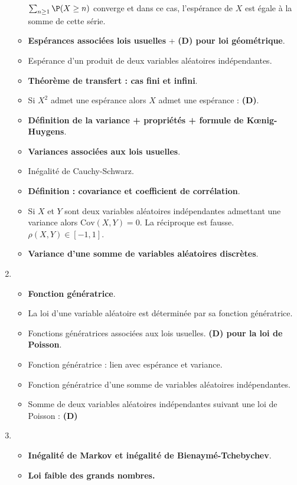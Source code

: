 \documentclass[twoside,a4paper,french,10pt]{VcCours}
\begin{document}
\begin{enumerate}
\begin{itemize}
  $\sum_{n \geq 1} \P(X \geq n)$
  converge et dans ce cas, l'espérance de $X$ est égale à la somme de cette série.
  \item \textbf{Espérances associées lois usuelles} + \textbf{(D) pour loi géométrique}.
  \item Espérance d'un produit de deux variables aléatoires indépendantes.
  \item \textbf{Théorème de transfert : cas fini et infini}. 
  \item Si $X^2$ admet une espérance alors $X$ admet une espérance : \textbf{(D)}.
  \item \textbf{Définition de la variance + propriétés + formule de Kœnig-Huygens}.
  \item \textbf{Variances associées aux lois usuelles}.
  \item Inégalité de Cauchy-Schwarz.
  \item \textbf{Définition : covariance et coefficient de corrélation}.
  \item Si $X$ et $Y$ sont deux variables aléatoires indépendantes admettant une variance alors $\textrm{Cov}(X,Y)=0$. La réciproque est fausse.
  $\rho(X,Y) \in [-1,1]$.
  \item \textbf{Variance d'une somme de variables aléatoires discrètes}.
  \end{itemize}
  \item
  \begin{itemize}
  \item \textbf{Fonction génératrice}.
  \item La loi d'une variable aléatoire est déterminée par sa fonction génératrice.
  \item Fonctions génératrices associées aux lois usuelles. \textbf{(D) pour la loi de Poisson}.
  \item Fonction génératrice : lien avec espérance et variance.
  \item Fonction génératrice d'une somme de variables aléatoires indépendantes.
  \item Somme de deux variables aléatoires indépendantes suivant une loi de Poisson : \textbf{(D)}
  \end{itemize}
  \item
  \begin{itemize}
  \item \textbf{Inégalité de Markov et inégalité de Bienaymé-Tchebychev}.
  \item \textbf{Loi faible des grands nombres.}
  \end{itemize}
  \end{enumerate}
\end{document}
